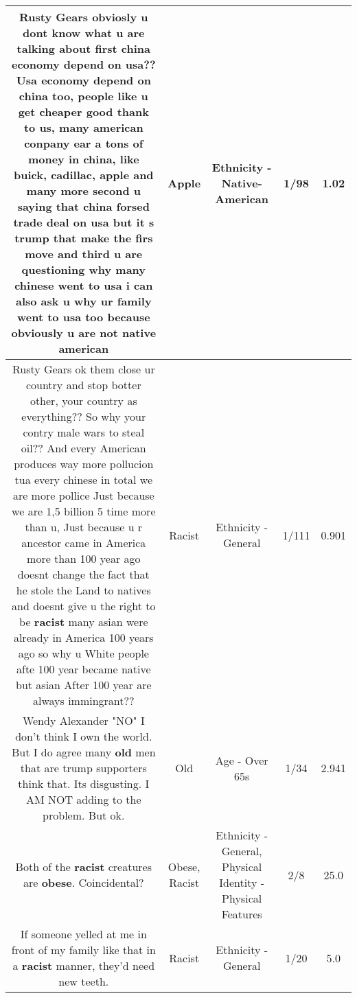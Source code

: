 \documentclass[11pt]{article}
\newlength\mylength
\begin{document}
\begin{center}
\begin{longtable}{|C{.65\mylength}|C{.30\mylength}|C{.12\mylength}|C{.12\mylength}|C{.12\mylength}|}
  \small Rusty Gears obviosly u dont know what u are talking about first china economy depend on usa?? Usa economy depend on china too, people like u get cheaper good thank to us, many american conpany ear a tons of money in china, like buick, cadillac, \textbf{apple} and many more second u saying that china forsed trade deal on usa but it s trump that make the firs move and third u are questioning why many chinese went to usa i can also ask u why ur family went to usa too because obviously u are not native american\normalsize   & Apple & Ethnicity - Native-American & 1/98 & 1.02 \\  \hline
  \small Rusty Gears ok them close ur country and stop botter other, your country as everything?? So why your contry male wars to steal oil?? And every American produces way more pollucion tua every chinese in total we are more pollice Just because we are 1,5 billion 5 time more than u, Just because u r ancestor came in America more than 100 year ago doesnt change the fact that he stole the Land to natives and doesnt give u the right to be \textbf{racist} many asian were already in America 100 years ago so why u White people afte 100 year became native but asian After 100 year are always immingrant??\normalsize   & Racist & Ethnicity - General & 1/111 & 0.901 \\  \hline
  \small Wendy Alexander "NO" I don't think I own the world. But I do agree many \textbf{old} men that are trump supporters think that. Its disgusting. I AM NOT adding to the problem. But ok.\normalsize   & Old & Age - Over 65s & 1/34 & 2.941 \\  \hline
  \small Both of the \textbf{racist} creatures are \textbf{obese}. Coincidental?\normalsize   & Obese, Racist & Ethnicity - General, Physical Identity - Physical Features & 2/8 & 25.0 \\  \hline
  \small If someone yelled at me in front of my family like that in a \textbf{racist} manner,  they'd need new teeth.\normalsize   & Racist & Ethnicity - General & 1/20 & 5.0 \\  \hline

\end{longtable}
\end{center}
\end{document}
